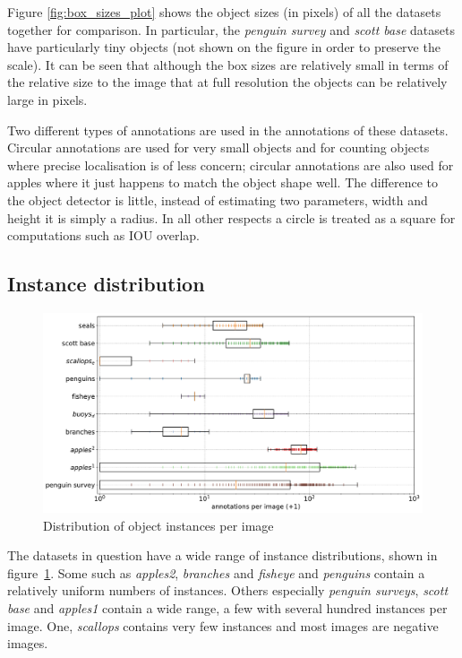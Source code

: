 Figure \ref{fig:box_sizes_plot}  shows the object sizes (in pixels) of all the datasets together for comparison. In particular, the \emph{penguin survey} and \emph{scott base} datasets have particularly tiny objects (not shown on the figure in order to preserve the scale). It can be seen that although the box sizes are relatively small in terms of the relative size to the image that at full resolution the objects can be relatively large in pixels.

Two different types of annotations are used in the annotations of these datasets. Circular annotations are used for very small objects and for counting objects where precise localisation is of less concern; circular annotations are also used for apples where it just happens to match the object shape well. The difference to the object detector is little, instead of estimating two parameters, width and height it is simply a radius. In all other respects a circle is treated as a square for computations such as \gls{IOU} overlap.

\subsection {Instance distribution}

\begin{figure}[ht]
\centering
\includegraphics[width=1.0\linewidth]{charts/summaries/instances_boxplot.pdf}
\caption{ Distribution of object instances per image }
\label{fig:instances_image_plot}
\end{figure}

The datasets in question have a wide range of instance distributions, shown in figure~\ref{fig:instances_image_plot}. Some such as \emph{apples2}, \emph{branches} and \emph{fisheye} and \emph{penguins} contain a relatively uniform numbers of instances. Others especially \emph {penguin surveys}, \emph{scott base} and \emph{apples1} contain a wide range, a few with several hundred instances per image. One, \emph{scallops} contains very few instances and most images are negative images.


